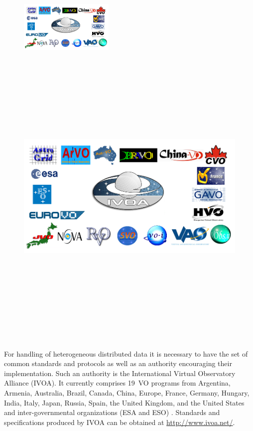    \begin{figure}
     \vspace{0pt}
     \begin{center}
       \ifpdf
       \includegraphics[width=0.4\textwidth]{ivoamembers}
       \else
       \includegraphics[bb = 92 86 545 742, height=6in]{ivoamembers.jpg}
       \fi
     \end{center}
     \vspace{-15pt}
     \vspace{-5pt}
   \end{figure}


   For handling of heterogeneous distributed data it is necessary to
   have the set of common standards and protocols as well as an
   authority encouraging their implementation. Such an authority is
   the International Virtual Observatory Alliance (IVOA). It currently
   comprises 19~VO programs from Argentina, Armenia, Australia,
   Brazil, Canada, China, Europe, France, Germany, Hungary, India,
   Italy, Japan, Russia, Spain, the United Kingdom, and the United
   States and inter-governmental organizations (ESA and ESO)
   \cite{hanisch2010international}. Standards and specifications
   produced by IVOA can be obtained at \url{http://www.ivoa.net/}.


